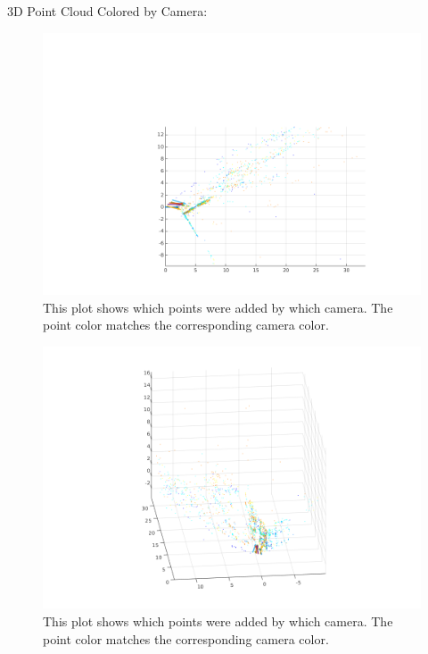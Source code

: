 \documentclass{article}
\begin{document}
3D Point Cloud Colored by Camera:
\begin{figure}[!h]
\includegraphics[width = \textwidth]{pointsbycam.png}
\centering
\caption{This plot shows which points were added by which camera. The point color matches the corresponding camera color.}
\end{figure}

\begin{figure}[!h]
\includegraphics[width = \textwidth]{pointsbycam2.png}
\centering
\caption{This plot shows which points were added by which camera. The point color matches the corresponding camera color.}
\end{figure}
\end{document}
